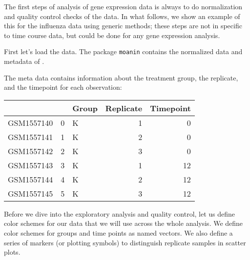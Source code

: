 \documentclass[9pt,a4paper,]{extarticle}
\newenvironment{Shaded}{\begin{snugshade}}{\end{snugshade}}
\newcommand{\CommentTok}[1]{\textcolor[rgb]{0.56,0.35,0.01}{\textit{#1}}}
\newcommand{\KeywordTok}[1]{\textcolor[rgb]{0.13,0.29,0.53}{\textbf{#1}}}
\newcommand{\NormalTok}[1]{#1}
\newcommand{\OperatorTok}[1]{\textcolor[rgb]{0.81,0.36,0.00}{\textbf{#1}}}
\newcommand{\StringTok}[1]{\textcolor[rgb]{0.31,0.60,0.02}{#1}}
\begin{document}
The first steps of analysis of gene expression data is always to do
normalization and quality control checks of the data. In what follows, we show
an example of this for the influenza data using generic methods; these steps
are not in specific to time course data, but could be done for any gene expression
analysis.

First let's load the data. The package \texttt{moanin} contains the normalized
data and metadata of \citep{shoemaker:ultrasensitive}.

\begin{Shaded}
\end{Shaded}

The meta data contains information about the treatment group, the replicate,
and the timepoint for each observation:

\begin{tabular}{l|r|l|r|r}
\hline
  &  & Group & Replicate & Timepoint\\
\hline
GSM1557140 & 0 & K & 1 & 0\\
\hline
GSM1557141 & 1 & K & 2 & 0\\
\hline
GSM1557142 & 2 & K & 3 & 0\\
\hline
GSM1557143 & 3 & K & 1 & 12\\
\hline
GSM1557144 & 4 & K & 2 & 12\\
\hline
GSM1557145 & 5 & K & 3 & 12\\
\hline
\end{tabular}

Before we dive into the exploratory analysis and quality control, let us
define color schemes for our data that we will use across the whole analysis.
We define color schemes for groups and time points as named vectors. We also
define a series of markers (or plotting symbols) to distinguish replicate
samples in scatter plots.
\end{document}
